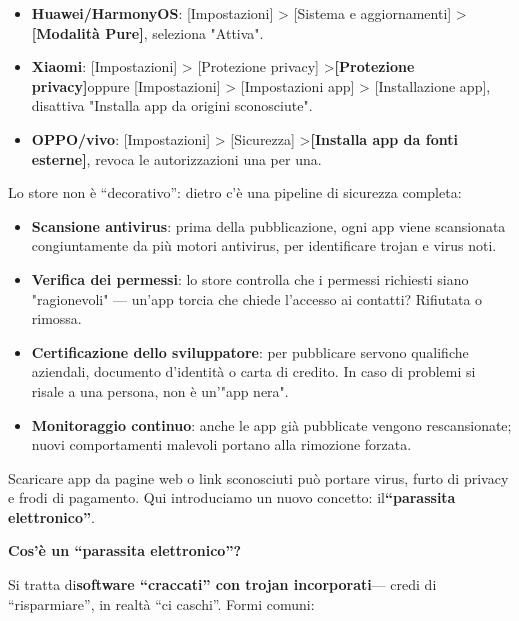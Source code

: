 
\begin{itemize}
  \item \textbf{Huawei/HarmonyOS}: [Impostazioni] > [Sistema e aggiornamenti] >\textbf{[Modalità Pure]}, seleziona "Attiva".
  \item \textbf{Xiaomi}: [Impostazioni] > [Protezione privacy] >\textbf{[Protezione privacy]}oppure [Impostazioni] > [Impostazioni app] > [Installazione app], disattiva "Installa app da origini sconosciute".
  \item \textbf{OPPO/vivo}: [Impostazioni] > [Sicurezza] >\textbf{[Installa app da fonti esterne]}, revoca le autorizzazioni una per una.
\end{itemize}


Lo store non è “decorativo”: dietro c'è una pipeline di sicurezza completa:

\begin{itemize}
  \item \textbf{Scansione antivirus}: prima della pubblicazione, ogni app viene scansionata congiuntamente da più motori antivirus, per identificare trojan e virus noti.
  \item \textbf{Verifica dei permessi}: lo store controlla che i permessi richiesti siano "ragionevoli" — un'app torcia che chiede l'accesso ai contatti? Rifiutata o rimossa.
  \item \textbf{Certificazione dello sviluppatore}: per pubblicare servono qualifiche aziendali, documento d'identità o carta di credito. In caso di problemi si risale a una persona, non è un'"app nera".
  \item \textbf{Monitoraggio continuo}: anche le app già pubblicate vengono rescansionate; nuovi comportamenti malevoli portano alla rimozione forzata.
\end{itemize}


Scaricare app da pagine web o link sconosciuti può portare virus, furto di privacy e frodi di pagamento. Qui introduciamo un nuovo concetto: il\textbf{“parassita elettronico”}.

\textbf{Cos'è un “parassita elettronico”?}\par

Si tratta di\textbf{software “craccati” con trojan incorporati}— credi di “risparmiare”, in realtà “ci caschi”. Formi comuni:

